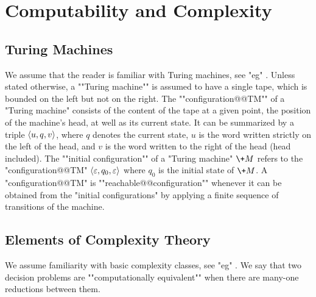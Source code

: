 \section{Computability and Complexity}

\subsection{Turing Machines}

We assume that the reader is familiar with Turing machines,
see "eg" \cite[\S~1]{AroraBarak2009ComputationalComplexity}.
Unless stated otherwise, a \AP""Turing machine"" is assumed to have a single tape,
which is bounded on the left but not on the right.
The ""configuration@@TM"" of a "Turing machine" consists of
the content of the tape at a given point, the position of the machine's head,
at well as its current state. It can be summarized by
a triple $\langle u, q, v\rangle$, where $q$ denotes the current state,
$u$ is the word written strictly on the left of the head,
and $v$ is the word written to the right of the head (head included).
The \AP""initial configuration"" of a "Turing machine" $\+M$ refers to the "configuration@@TM" 
$\langle\varepsilon, q_0, \varepsilon\rangle$ where $q_0$ is the initial state of $\+M$.
A "configuration@@TM" is \AP""reachable@@configuration"" whenever
it can be obtained from the "initial configurations" by applying a finite sequence
of transitions of the machine.

\subsection{Elements of Complexity Theory}

We assume familiarity with basic complexity classes, see "eg"
\cite[\S\!\S~2--5]{AroraBarak2009ComputationalComplexity}.
We say that two decision problems are \AP""computationally equivalent""
when there are many-one reductions between them.


